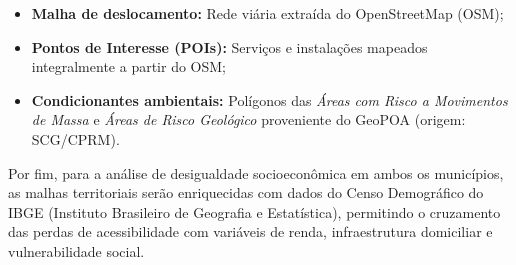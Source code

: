 \begin{itemize}
    \item \textbf{Malha de deslocamento:} Rede viária extraída do OpenStreetMap (OSM);
    \item \textbf{Pontos de Interesse (POIs):} Serviços e instalações mapeados integralmente a partir do OSM;
    \item \textbf{Condicionantes ambientais:} Polígonos das \textit{Áreas com Risco a Movimentos de Massa} e \textit{Áreas de Risco Geológico} proveniente do GeoPOA (origem: SCG/CPRM).
\end{itemize}

Por fim, para a análise de desigualdade socioeconômica em ambos os municípios, as malhas territoriais serão enriquecidas com dados do Censo Demográfico do IBGE (Instituto Brasileiro de Geografia e Estatística), permitindo o cruzamento das perdas de acessibilidade com variáveis de renda, infraestrutura domiciliar e vulnerabilidade social.
